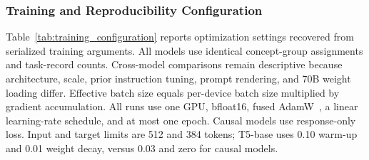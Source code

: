 \documentclass[a4paper,fleqn]{cas-sc}
\begin{document}
\begin{table}[H]
\centering
\caption{Evaluated models and fine-tuning methods.}
\label{tab:models_metrics}
\end{table}

\subsubsection{Training and Reproducibility Configuration}

Table~\ref{tab:training_configuration} reports optimization settings recovered from serialized training arguments. All models use identical concept-group assignments and task-record counts. Cross-model comparisons remain descriptive because architecture, scale, prior instruction tuning, prompt rendering, and 70B weight loading differ. Effective batch size equals per-device batch size multiplied by gradient accumulation. All runs use one GPU, bfloat16, fused AdamW~\cite{loshchilov2019decoupled}, a linear learning-rate schedule, and at most one epoch. Causal models use response-only loss. Input and target limits are 512 and 384 tokens; T5-base uses 0.10 warm-up and 0.01 weight decay, versus 0.03 and zero for causal models.
\end{document}
